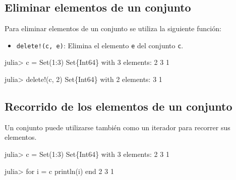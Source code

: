 \documentclass[
  letterpaper,
  DIV=11,
  numbers=noendperiod]{scrreprt}
\newenvironment{Shaded}{\begin{snugshade}}{\end{snugshade}}
\newcommand{\ControlFlowTok}[1]{\textcolor[rgb]{0.00,0.23,0.31}{#1}}
\newcommand{\DataTypeTok}[1]{\textcolor[rgb]{0.68,0.00,0.00}{#1}}
\newcommand{\FloatTok}[1]{\textcolor[rgb]{0.68,0.00,0.00}{#1}}
\newcommand{\FunctionTok}[1]{\textcolor[rgb]{0.28,0.35,0.67}{#1}}
\newcommand{\NormalTok}[1]{\textcolor[rgb]{0.00,0.23,0.31}{#1}}
\newcommand{\OperatorTok}[1]{\textcolor[rgb]{0.37,0.37,0.37}{#1}}
\providecommand{\tightlist}{%
  \setlength{\itemsep}{0pt}\setlength{\parskip}{0pt}}\usepackage{longtable,booktabs,array}
\begin{document}
\hypertarget{eliminar-elementos-de-un-conjunto}{%
\subsection{Eliminar elementos de un
conjunto}\label{eliminar-elementos-de-un-conjunto}}

Para eliminar elementos de un conjunto se utiliza la siguiente función:

\begin{itemize}
\tightlist
\item
  \texttt{delete!(c,\ e)}: Elimina el elemento \texttt{e} del conjunto
  \texttt{c}.
\end{itemize}

\begin{Shaded}
\begin{Highlighting}[]
\NormalTok{julia}\OperatorTok{\textgreater{}}\NormalTok{ c }\OperatorTok{=} \FunctionTok{Set}\NormalTok{(}\FloatTok{1}\OperatorTok{:}\FloatTok{3}\NormalTok{)}
\DataTypeTok{Set}\NormalTok{\{}\DataTypeTok{Int64}\NormalTok{\} with }\FloatTok{3}\NormalTok{ elements}\OperatorTok{:}
  \FloatTok{2}
  \FloatTok{3}
  \FloatTok{1}

\NormalTok{julia}\OperatorTok{\textgreater{}} \FunctionTok{delete!}\NormalTok{(c, }\FloatTok{2}\NormalTok{)}
\DataTypeTok{Set}\NormalTok{\{}\DataTypeTok{Int64}\NormalTok{\} with }\FloatTok{2}\NormalTok{ elements}\OperatorTok{:}
  \FloatTok{3}
  \FloatTok{1}
\end{Highlighting}
\end{Shaded}

\hypertarget{recorrido-de-los-elementos-de-un-conjunto}{%
\subsection{Recorrido de los elementos de un
conjunto}\label{recorrido-de-los-elementos-de-un-conjunto}}

Un conjunto puede utilizarse también como un iterador para recorrer sus
elementos.

\begin{Shaded}
\begin{Highlighting}[]
\NormalTok{julia}\OperatorTok{\textgreater{}}\NormalTok{ c }\OperatorTok{=} \FunctionTok{Set}\NormalTok{(}\FloatTok{1}\OperatorTok{:}\FloatTok{3}\NormalTok{)}
\DataTypeTok{Set}\NormalTok{\{}\DataTypeTok{Int64}\NormalTok{\} with }\FloatTok{3}\NormalTok{ elements}\OperatorTok{:}
  \FloatTok{2}
  \FloatTok{3}
  \FloatTok{1}

\NormalTok{julia}\OperatorTok{\textgreater{}} \ControlFlowTok{for}\NormalTok{ i }\OperatorTok{=}\NormalTok{ c}
         \FunctionTok{println}\NormalTok{(i)}
       \ControlFlowTok{end}
\FloatTok{2}
\FloatTok{3}
\FloatTok{1}
\end{Highlighting}
\end{Shaded}
\end{document}
